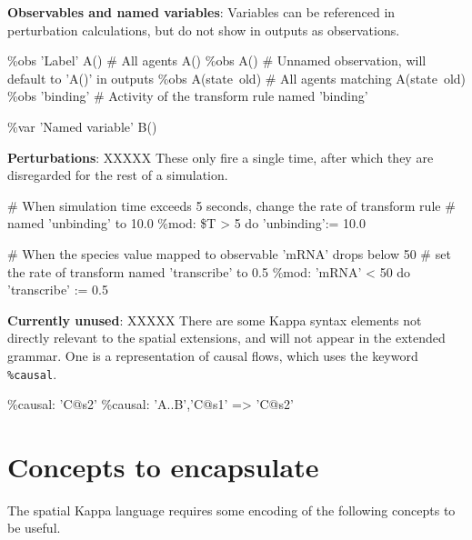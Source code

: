 \textbf{Observables and named variables}: Variables can be referenced in perturbation calculations, but do not show in outputs as observations.

\begin{kappasource}
\%obs 'Label' A()  # All agents A()
\%obs A()          # Unnamed observation, will default to 'A()' in outputs
\%obs A(state~old) # All agents matching A(state~old)
\%obs 'binding'    # Activity of the transform rule named 'binding'

\%var 'Named variable' B()
\end{kappasource} 

\textbf{Perturbations}: XXXXX These only fire a single time, after which they are disregarded for the rest of a simulation.

\begin{kappasource}
# When simulation time exceeds 5 seconds, change the rate of transform rule
#   named 'unbinding' to 10.0
\%mod: \$T > 5 do ’unbinding’:= 10.0

# When the species value mapped to observable 'mRNA' drops below 50
#   set the rate of transform named 'transcribe' to 0.5
\%mod: 'mRNA' < 50 do 'transcribe' := 0.5
\end{kappasource} 

\textbf{Currently unused}: XXXXX There are some Kappa syntax elements not directly relevant to the spatial extensions, and will not appear in the extended grammar. One is a representation of causal flows, which uses the keyword \verb|%causal|.

\begin{kappasource}
\%causal: ’C@s2’ 
\%causal: {’A..B’,’C@s1’} => ’C@s2’ 
\end{kappasource} 


\section{Concepts to encapsulate}

The spatial Kappa language requires some encoding of the following concepts to be useful.

